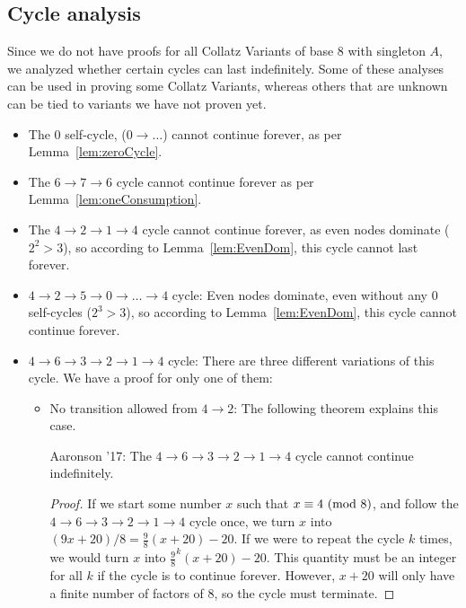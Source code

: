 \subsection{Cycle analysis} \label{subsubsec:cycleanalysis}
Since we do not have proofs for all Collatz Variants of base 8 with singleton $A$, we analyzed whether certain cycles can last indefinitely. Some of these analyses can be used in proving some Collatz Variants, whereas others that are unknown can be tied to variants we have not proven yet.
\begin{itemize}
    \item The 0 self-cycle, ($0  \rightarrow \ldots$) cannot continue forever, as per Lemma~\ref{lem:zeroCycle}.
    \item The $6 \rightarrow 7 \rightarrow 6$ cycle cannot continue forever as per Lemma~\ref{lem:oneConsumption}.
    \item The $4 \rightarrow 2 \rightarrow 1 \rightarrow 4$ cycle cannot continue forever, as even nodes dominate ($2^2 > 3$), so according to Lemma~\ref{lem:EvenDom}, this cycle cannot last forever.
    \item $4 \rightarrow 2 \rightarrow 5 \rightarrow 0  \rightarrow \ldots \rightarrow 4$ cycle:  Even nodes dominate, even without any 0 self-cycles ($2^3 > 3$), so according to Lemma~\ref{lem:EvenDom}, this cycle cannot continue forever.
    \item $4 \rightarrow 6 \rightarrow 3 \rightarrow 2 \rightarrow 1 \rightarrow 4$ cycle: There are three different variations of this cycle. We have a proof for only one of them:
\begin{itemize}
  \item No transition allowed from $4 \rightarrow 2$: The following theorem explains this case.
  \begin{theorem} Aaronson '17: The $4 \rightarrow 6 \rightarrow 3 \rightarrow 2 \rightarrow 1 \rightarrow 4$ cycle cannot continue indefinitely.
  \end{theorem}
  \begin{proof}
    If we start some number $x$ such that $x \equiv 4\ (\mathrm{mod}\ 8)$, and follow the $4 \rightarrow 6 \rightarrow 3 \rightarrow 2 \rightarrow 1 \rightarrow 4$ cycle once, we turn $x$ into $(9x+20)/8 = \frac{9}{8}(x+20)-20$. If we were to repeat the cycle $k$ times, we would turn $x$ into $\frac{9}{8}^k(x+20)-20$. This quantity must be an integer for all $k$ if the cycle is to continue forever. However, $x+20$ will only have a finite number of factors of 8, so the cycle must terminate.
  \end{proof}

\end{itemize}
\end{itemize}
